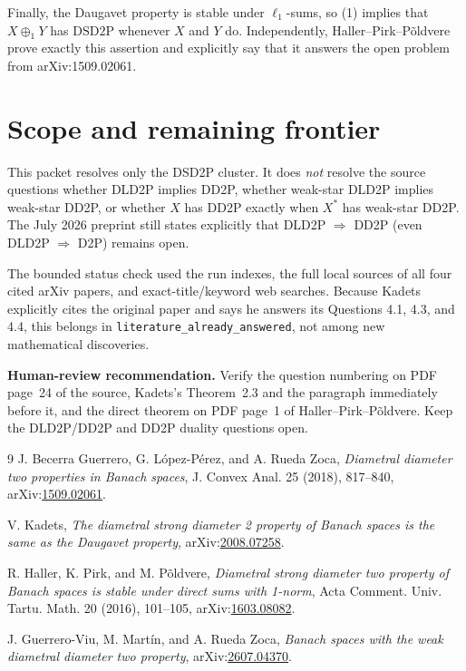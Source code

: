 \documentclass[11pt]{article}
\newcommand{\DSD}{\mathrm{DSD2P}}
\begin{document}
Finally, the Daugavet property is stable under $\ell_1$-sums, so (1) implies
that $X\oplus_1Y$ has $\DSD$ whenever $X$ and $Y$ do.  Independently,
Haller--Pirk--P\~oldvere prove exactly this assertion and explicitly say that
it answers the open problem from arXiv:1509.02061.

\section*{Scope and remaining frontier}

This packet resolves only the DSD2P cluster.  It does \emph{not} resolve the
source questions whether DLD2P implies DD2P, whether weak-star DLD2P implies
weak-star DD2P, or whether
$X$ has DD2P exactly when $X^*$ has weak-star DD2P.  The July 2026 preprint
\cite{WeakDD2P} still states explicitly that DLD2P $\Rightarrow$ DD2P (even
DLD2P $\Rightarrow$ D2P) remains open.

The bounded status check used the run indexes, the full local sources of all
four cited arXiv papers, and exact-title/keyword web searches.  Because
Kadets explicitly cites the original paper and says he answers its Questions
4.1, 4.3, and 4.4, this belongs in \texttt{literature\_already\_answered},
not among new mathematical discoveries.

\textbf{Human-review recommendation.} Verify the question numbering on PDF
page~24 of the source, Kadets's Theorem~2.3 and the paragraph immediately
before it, and the direct theorem on PDF page~1 of Haller--Pirk--P\~oldvere.
Keep the DLD2P/DD2P and DD2P duality questions open.

\begin{thebibliography}{9}
J. Becerra Guerrero, G. L\'opez-P\'erez, and A. Rueda Zoca,
\emph{Diametral diameter two properties in Banach spaces},
J. Convex Anal. 25 (2018), 817--840,
arXiv:\href{https://arxiv.org/abs/1509.02061}{1509.02061}.

V. Kadets,
\emph{The diametral strong diameter 2 property of Banach spaces is the same
as the Daugavet property},
arXiv:\href{https://arxiv.org/abs/2008.07258}{2008.07258}.

R. Haller, K. Pirk, and M. P\~oldvere,
\emph{Diametral strong diameter two property of Banach spaces is stable under
direct sums with 1-norm},
Acta Comment. Univ. Tartu. Math. 20 (2016), 101--105,
arXiv:\href{https://arxiv.org/abs/1603.08082}{1603.08082}.

J. Guerrero-Viu, M. Mart\'in, and A. Rueda Zoca,
\emph{Banach spaces with the weak diametral diameter two property},
arXiv:\href{https://arxiv.org/abs/2607.04370}{2607.04370}.
\end{thebibliography}
\end{document}
